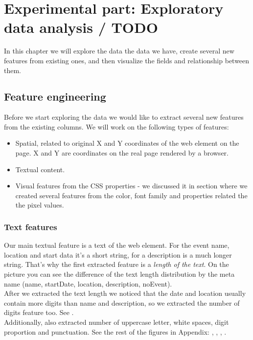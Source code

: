 \chapter{Experimental part: Exploratory data analysis / TODO}
\label{chap:dataexplore}
In this chapter we will explore the data the data we have, create several new features from existing ones, and then visualize the fields and relationship between them. \\



\section{Feature engineering}
Before we start exploring the data we would like to extract several new features from the existing columns. We will work on the following types of features: 

\begin{itemize}
\item Spatial, related to original X and Y coordinates of the web element on the page. X and Y are coordinates on the real page rendered by a browser. 
\item Textual content.
\item Visual features from the CSS properties - we discussed it in section  where we created several features from the color, font family and properties related the the pixel values. 
\end{itemize}

\subsection{Text features}

Our main textual feature is a text of the web element. For the event name, location and start data it's a short string, for a description is a much longer string. That's why the first extracted feature is a \textit{length of the text}. On the picture  you can see the difference of the text length distribution by the meta name (name, startDate, location, description, noEvent). \\

After we extracted the text length we noticed that the date and location usually contain more digits than name and description, so we extracted the number of digits feature too. See .\\

Additionally, also extracted number of uppercase letter, white spaces, digit proportion and punctuation. See the rest of the figures in Appendix: , , , .

